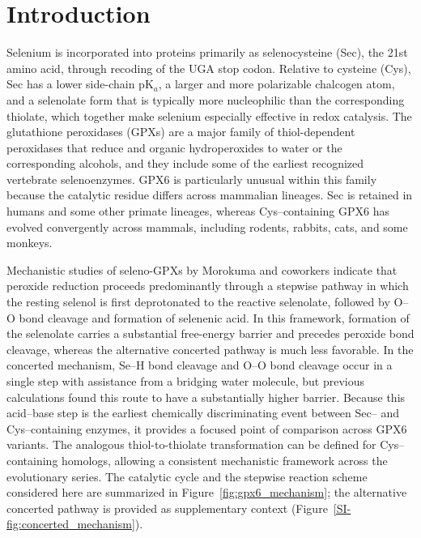 \section{Introduction}

Selenium is incorporated into proteins primarily as selenocysteine (Sec), the 21st amino acid, through recoding of the UGA stop codon.\cite{Berry1991UGA,Kryukov2003Selenoproteomes,Shetty2015Selenocysteine,hondal_selenium_2011,Labunskyy2014} Relative to cysteine (Cys), Sec has a lower side-chain pK$_a$, a larger and more polarizable chalcogen atom, and a selenolate form that is typically more nucleophilic than the corresponding thiolate, which together make selenium especially effective in redox catalysis.\cite{johansson_selenocysteine_2005,hondal_selenium_2011,Arner2010,ChungKrahn2022SelenocysteineToolbox,Reich2016,Kanavos2026SecSelectivity} The glutathione peroxidases (GPXs) are a major family of thiol-dependent peroxidases that reduce  and organic hydroperoxides to water or the corresponding alcohols, and they include some of the earliest recognized vertebrate selenoenzymes.\cite{Rotruck1973,BrigeliusFlohe2013GlutathionePeroxidases,pei_research_2023} GPX6 is particularly unusual within this family because the catalytic residue differs across mammalian lineages. Sec is retained in humans and some other primate lineages, whereas Cys--containing GPX6 has evolved convergently across mammals, including rodents, rabbits, cats, and some monkeys.\cite{BrigeliusFlohe2013GlutathionePeroxidases,rees_ancient_2024}

Mechanistic studies of seleno-GPXs by Morokuma and coworkers\cite{prabhakar_elucidation_2005,prabhakar_is_2006} indicate that peroxide reduction proceeds predominantly through a stepwise pathway in which the resting selenol is first deprotonated to the reactive selenolate, followed by O--O bond cleavage and formation of selenenic acid. 
In this framework, formation of the selenolate carries a substantial free-energy barrier and precedes peroxide bond cleavage, whereas the alternative concerted pathway is much less favorable. 
In the concerted mechanism, Se--H bond cleavage and  O--O bond cleavage occur in a single step with assistance from a bridging water molecule, but previous calculations found this route to have a substantially higher barrier.
Because this acid--base step is the earliest chemically discriminating event between Sec-- and Cys--containing enzymes, it provides a focused point of comparison across GPX6 variants.\cite{prabhakar_is_2006,cardey_selenocysteine_2007} The analogous thiol-to-thiolate transformation can be defined for Cys--containing homologs, allowing a consistent mechanistic framework across the evolutionary series.\cite{cardey_selenocysteine_2007}
The catalytic cycle and the stepwise reaction scheme considered here are summarized in Figure~\ref{fig:gpx6_mechanism}; the alternative concerted pathway is provided as supplementary context (Figure~\ref{SI-fig:concerted_mechanism}). 


